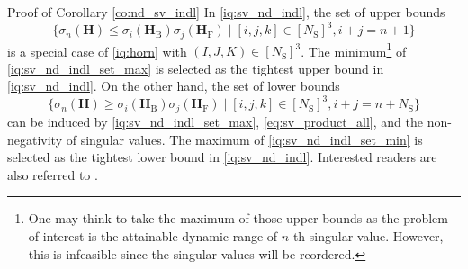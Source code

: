 \documentclass[journal]{IEEEtran}
\begin{document}
\begin{appendix}
	\begin{subsection}{Proof of Corollary \ref{co:nd_sv_indl}}
		\label{ap:nd_sv_indl}
		In \eqref{iq:sv_nd_indl}, the set of upper bounds
		\begin{equation}
			\label{iq:sv_nd_indl_set_max}
			\bigl\{\sigma_n(\mathbf{H}) \le \sigma_i(\mathbf{H}_\mathrm{B}) \sigma_j(\mathbf{H}_\mathrm{F}) \mid [i,j,k] \in [N_\mathrm{S}]^3, i+j=n+1\bigr\}
		\end{equation}
		is a special case of \eqref{iq:horn} with $(I, J, K) \in [N_\mathrm{S}]^3$.
		The minimum\footnote{One may think to take the maximum of those upper bounds as the problem of interest is the attainable dynamic range of $n$-th singular value. However, this is infeasible since the singular values will be reordered.} of \eqref{iq:sv_nd_indl_set_max} is selected as the tightest upper bound in \eqref{iq:sv_nd_indl}.
		On the other hand, the set of lower bounds
		\begin{equation}
			\label{iq:sv_nd_indl_set_min}
			\bigl\{\sigma_n(\mathbf{H}) \ge \sigma_i(\mathbf{H}_\mathrm{B}) \sigma_j(\mathbf{H}_\mathrm{F}) \mid [i,j,k] \in [N_\mathrm{S}]^3, i+j=n+N_\mathrm{S}\bigr\}
		\end{equation}
		can be induced by \eqref{iq:sv_nd_indl_set_max}, \eqref{eq:sv_product_all}, and the non-negativity of singular values.
		The maximum of \eqref{iq:sv_nd_indl_set_min} is selected as the tightest lower bound in \eqref{iq:sv_nd_indl}.
		Interested readers are also referred to \cite[(2.0.3)]{Zhang2005}.


\end{subsection}
\end{appendix}
\end{document}
